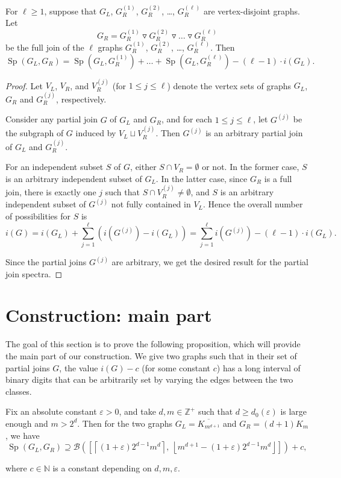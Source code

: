 \documentclass[10pt,a4paper]{article}
\numberwithin{equation}{section}
\newcommand{\nn}{\mathbb{N}}
\newcommand{\zz}{\mathbb{Z}}
\newcommand{\eps}{\varepsilon}
\newcommand{\cB}{\mathcal{B}}
\DeclareMathOperator{\Sp}{Sp}
\begin{document}
\begin{lemma}\label{lem:join_with_multiple}
For $\ell\ge 1$, suppose that $G_L$, $G^{(1)}_R$, $G^{(2)}_R$, \dots, $G^{(\ell)}_R$ are vertex-disjoint graphs. Let 
$$G_R=G^{(1)}_R\triangledown G^{(2)}_R \triangledown \dots\triangledown G^{(\ell)}_R$$ be the full join of the $\ell$ graphs $G^{(1)}_R$, $G^{(2)}_R$, \dots, $G^{(\ell)}_R$. Then
$$\Sp(G_L,G_R)=\Sp(G_L,G^{(1)}_R) + \ldots + \Sp(G_L,G^{(\ell)}_R) - (\ell-1)\cdot i(G_L).$$
\end{lemma}
\begin{proof}
Let $V_L$, $V_R$, and $V^{(j)}_R$ (for $1\le j\le \ell$) denote the vertex sets of graphs $G_L$, $G_R$ and $G^{(j)}_R$, respectively.

Consider any partial join $G$ of $G_L$ and $G_R$, and for each $1\le j\le \ell$, let $G^{(j)}$ be the subgraph of $G$ induced by $V_L\sqcup V^{(j)}_R$. Then $G^{(j)}$ is an arbitrary partial join of $G_L$ and $G^{(j)}_R$.

For an independent subset $S$ of $G$, either $S\cap V_R=\emptyset$ or not. In the former case, $S$ is an arbitrary independent subset of $G_L$. In the latter case, since $G_R$ is a full join, there is exactly one $j$ such that $S\cap V_R^{(j)}\ne \emptyset$, and $S$ is an arbitrary independent subset of $G^{(j)}$ not fully contained in $V_L$. Hence the overall number of possibilities for $S$ is
$$i(G)=i(G_L) + \sum_{j=1}^{\ell} \left(i(G^{(j)}) - i(G_L)\right)=\sum_{j=1}^{\ell} i(G^{(j)}) - (\ell-1)\cdot i(G_L).$$

Since the partial joins $G^{(j)}$ are arbitrary, we get the desired result for the partial join spectra.
\end{proof}

\section{Construction: main part}\label{sec:constr_main}
The goal of this section is to prove the following proposition, which will provide the main part of our construction. We give two graphs such that in their set of partial joins $G$, the value $i(G)-c$ (for some constant $c$) has a long interval of binary digits that can be arbitrarily set by varying the edges between the two classes.

\begin{proposition}\label{prop:long_interval}
Fix an absolute constant $\eps>0$, and take $d,m\in \zz^{+}$ such that $d\ge d_0(\eps)$ is large enough and $m>2^d$. Then for the two graphs $G_L=\overline{K_{m^{d+1}}}$ and $G_R=(d+1)K_m$, we have
$$\Sp(G_L,G_R)\supseteq \cB\left(\left[\left\lceil(1+\eps)2^{d-1}m^d\right\rceil,~ \left\lfloor m^{d+1}-(1+\eps)2^{d-1}m^d\right\rfloor\right]\right)+c,$$

where $c\in \nn$ is a constant depending on $d,m,\eps$.
\end{proposition}
\end{document}
